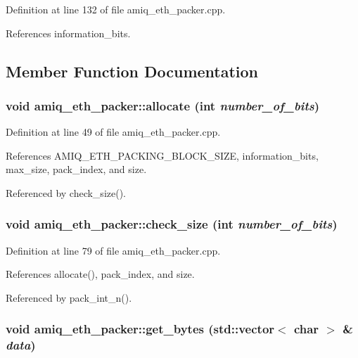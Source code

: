 Definition at line 132 of file amiq\_\-eth\_\-packer.cpp.

References information\_\-bits.

\subsection{Member Function Documentation}
\hypertarget{classamiq__eth__packer_a96f5c9604c2f26808693738fc3ccc559}{
\subsubsection[{allocate}]{\setlength{\rightskip}{0pt plus 5cm}void amiq\_\-eth\_\-packer::allocate (int {\em number\_\-of\_\-bits})}}
\label{classamiq__eth__packer_a96f5c9604c2f26808693738fc3ccc559}


Definition at line 49 of file amiq\_\-eth\_\-packer.cpp.

References AMIQ\_\-ETH\_\-PACKING\_\-BLOCK\_\-SIZE, information\_\-bits, max\_\-size, pack\_\-index, and size.

Referenced by check\_\-size().\hypertarget{classamiq__eth__packer_a254b9bc4b64955eab0e05c2ee0e5b71a}{
\subsubsection[{check\_\-size}]{\setlength{\rightskip}{0pt plus 5cm}void amiq\_\-eth\_\-packer::check\_\-size (int {\em number\_\-of\_\-bits})}}
\label{classamiq__eth__packer_a254b9bc4b64955eab0e05c2ee0e5b71a}


Definition at line 79 of file amiq\_\-eth\_\-packer.cpp.

References allocate(), pack\_\-index, and size.

Referenced by pack\_\-int\_\-n().\hypertarget{classamiq__eth__packer_a17d66f0e67b9b2d85dfe047363bd7a92}{
\subsubsection[{get\_\-bytes}]{\setlength{\rightskip}{0pt plus 5cm}void amiq\_\-eth\_\-packer::get\_\-bytes (std::vector$<$ char $>$ \& {\em data})}}
\label{classamiq__eth__packer_a17d66f0e67b9b2d85dfe047363bd7a92}



